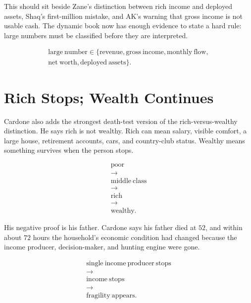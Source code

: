\documentclass[11pt,oneside]{book}
\begin{document}
This should sit beside Zane's distinction between rich income and deployed assets, Shaq's first-million mistake, and AK's warning that gross income is not usable cash. The dynamic book now has enough evidence to state a hard rule: large numbers must be classified before they are interpreted.

\begin{equation}
\begin{gathered}
\mathrm{large\ number}
\in\{\mathrm{revenue},\mathrm{gross\ income},\mathrm{monthly\ flow},\\
\mathrm{net\ worth},\mathrm{deployed\ assets}\}.
\end{gathered}
\end{equation}

\section{Rich Stops; Wealth Continues}

Cardone also adds the strongest death-test version of the rich-versus-wealthy distinction. He says rich is not wealthy. Rich can mean salary, visible comfort, a large house, retirement accounts, cars, and country-club status. Wealthy means something survives when the person stops.

\begin{equation}
\begin{gathered}
\mathrm{poor}\\
\longrightarrow\\
\mathrm{middle\ class}\\
\longrightarrow\\
\mathrm{rich}\\
\longrightarrow\\
\mathrm{wealthy}.
\end{gathered}
\end{equation}

His negative proof is his father. Cardone says his father died at \(52\), and within about \(72\) hours the household's economic condition had changed because the income producer, decision-maker, and hunting engine were gone.

\begin{equation}
\begin{gathered}
\mathrm{single\ income\ producer\ stops}\\
\longrightarrow\\
\mathrm{income\ stops}\\
\longrightarrow\\
\mathrm{fragility\ appears}.
\end{gathered}
\end{equation}
\end{document}
